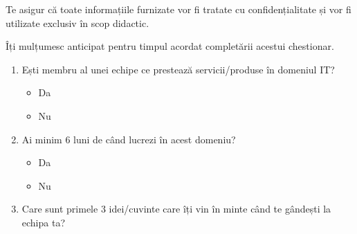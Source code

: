 \documentclass[a4paper, 12pt]{article}
\makeatletter
\newcommand*{\radiobutton}{\@ifstar{\radiobuttonON}{\radiobuttonOFF}}
\def\radiobuttonON{\raisebox{-1.5pt}{\stackinset{c}{}{c}{.35pt}{$\bullet$}{\scalebox{2}{$\circ$}}}}
\def\radiobuttonOFF{\raisebox{-1.5pt}{\scalebox{2}{$\circ$}}}
\makeatother
\begin{document}
	\quad Te asigur că toate informațiile furnizate vor fi tratate cu confidențialitate și vor fi utilizate exclusiv în scop didactic.

	\quad Îți mulțumesc anticipat pentru timpul acordat completării acestui chestionar.
	\newline

	\begin{enumerate}
		\item Ești membru al unei echipe ce prestează servicii/produse în domeniul IT?
			\begin{itemize}
				\item[\radiobutton] Da
				\item[\radiobutton] Nu
			\end{itemize}
		\item Ai minim 6 luni de când lucrezi în acest domeniu?
			\begin{itemize}
				\item[\radiobutton] Da
				\item[\radiobutton] Nu
			\end{itemize}
		\item Care sunt primele 3 idei/cuvinte care îți vin în minte când te gândești la echipa ta?


\end{enumerate}
\end{document}
